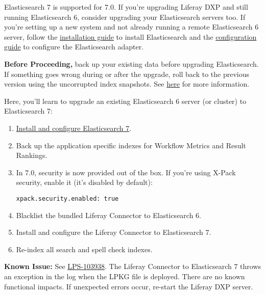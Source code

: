 Elasticsearch 7 is supported for 7.0. If you're upgrading Liferay DXP
and still running Elasticsearch 6, consider upgrading your Elasticsearch
servers too. If you're setting up a new system and not already running a
remote Elasticsearch 6 server, follow the
\href{/docs/7-2/deploy/-/knowledge_base/d/installing-elasticsearch}{installation
guide} to install Elasticsearch and the
\href{/docs/7-2/deploy/-/knowledge_base/d/configuring-the-liferay-elasticsearch-connector}{configuration
guide} to configure the Elasticsearch adapter.

\noindent\hrulefill

\textbf{Before Proceeding,} back up your existing data before upgrading
Elasticsearch. If something goes wrong during or after the upgrade, roll
back to the previous version using the uncorrupted index snapshots. See
\href{/docs/7-2/deploy/-/knowledge_base/d/backing-up-elasticsearch}{here}
for more information.

\noindent\hrulefill

Here, you'll learn to upgrade an existing Elasticsearch 6 server (or
cluster) to Elasticsearch 7:

\begin{enumerate}
\def\labelenumi{\arabic{enumi}.}
\item
  \href{/docs/7-2/deploy/-/knowledge_base/d/installing-elasticsearch}{Install
  and configure Elasticsearch 7}.
\item
  Back up the application specific indexes for Workflow Metrics and
  Result Rankings.
\item
  In 7.0, security is now provided out of the box. If you're using
  X-Pack security, enable it (it's disabled by default):

\begin{verbatim}
xpack.security.enabled: true
\end{verbatim}
\item
  Blacklist the bundled Liferay Connector to Elasticsearch 6.
\item
  Install and configure the Liferay Connector to Elasticsearch 7.
\item
  Re-index all search and spell check indexes.
\end{enumerate}

\noindent\hrulefill

\textbf{Known Issue:} See
\href{https://issues.liferay.com/browse/LPS-103938}{LPS-103938}. The
Liferay Connector to Elasticsearch 7 throws an exception in the log when
the LPKG file is deployed. There are no known functional impacts. If
unexpected errors occur, re-start the Liferay DXP server.

